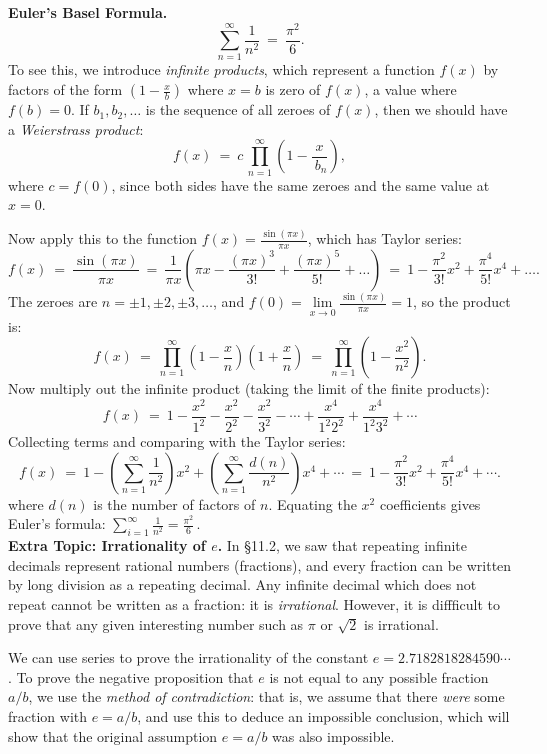 \documentclass[11pt]{article}
\begin{document}
\noindent
{\bf Euler's Basel Formula.}  
$$ \sum_{n=1}^\infty \frac1{n^2} \ =\  \frac{\pi^2}6.$$
%
To see this, we introduce {\it infinite products}, which represent a function $f(x)$ by
factors of the form $(1-\frac xb)$ where $x=b$ is zero of $f(x)$, a value where $f(b) = 0$.
If $b_1, b_2,\ldots $ is the sequence of all zeroes of $f(x)$, then we should have a 
{\it Weierstrass product}:
$$
f(x) \ = \ c\,\prod_{n=1}^\infty \left(1-\frac x{\ b_n}\right),
$$
where $c=f(0)$, since both sides have the same zeroes and the same value at $x=0$. 

Now apply this to the function $f(x) = \frac{\sin(\pi x)}{\pi x}$, which has Taylor series:
$$
f(x) \ = \ \frac{\sin(\pi x)}{\pi x} 
\ = \ 
\frac{1}{\pi x}\left(\pi x -\frac{(\pi x)^3}{3!} + \frac{(\pi x)^5}{5!}+ \ldots \right)
\ = \ 
1 -\frac{\pi^2}{3!} x^2 + \frac{\pi^4}{5!}x^4 + \ldots   .      
$$
The zeroes are $n = \pm 1, \pm 2, \pm 3,\ldots$, and 
$f(0) = \lim\limits_{x\to0}\frac{\sin(\pi x)}{\pi x}= 1$, so the product is:
$$
f(x) 
\ = \ 
\prod_{n=1}^\infty \left(1-\frac x{n}\right)\left(1+\frac x{n}\right)
\ = \ 
\prod_{n=1}^\infty \left(1-\frac{x^2}{n^2}\right).
$$
Now multiply out the infinite product (taking the limit of the finite products):
$$
f(x) \ = \ 1 -\frac{x^2}{1^2} - \frac{x^2}{2^2} - \frac{x^2}{3^2} - \cdots
+ \frac{x^4}{1^2 2^2} + \frac{x^4}{1^2 3^2} + \cdots
$$
Collecting terms and comparing with the Taylor series:
$$
f(x) \ = \ 1 - \left(\sum_{n=1}^\infty \frac1{n^2}\right)\!x^2 +
\left(\sum_{n=1}^\infty \frac{d(n)}{n^2}\right)\!x^4 + \cdots
\ = \ 1 -\frac{\pi^2}{3!} x^2 + \frac{\pi^4}{5!}x^4 + \cdots .
$$
where $d(n)$ is the number of factors of $n$.
Equating the $x^2$ coefficients gives Euler's formula: $\sum_{i=1}^\infty \frac1{n^2} = \frac{\pi^2}6$\,.
\\[1em]
{\bf Extra Topic: Irrationality of $e$.}  In \S11.2, 
we saw that repeating infinite decimals represent rational numbers (fractions),
and every fraction can be written by long division as a repeating decimal.
Any infinite decimal which does not repeat cannot be written as a fraction: 
it is {\it irrational}. However, it is diffficult to prove that any given interesting number
such as $\pi$ or $\sqrt 2$ is irrational. 

We can use series to prove the irrationality of the constant
$e =2.7182818284590\cdots$.
To prove the negative proposition that $e$ is not equal to any possible fraction $a/b$,
we use the {\it method of contradiction}: 
that is, we assume that there {\it were} some fraction with $e=a/b$, 
and use this to deduce an impossible conclusion, which will show 
that the original assumption  $e=a/b$ was also impossible.
\end{document}
